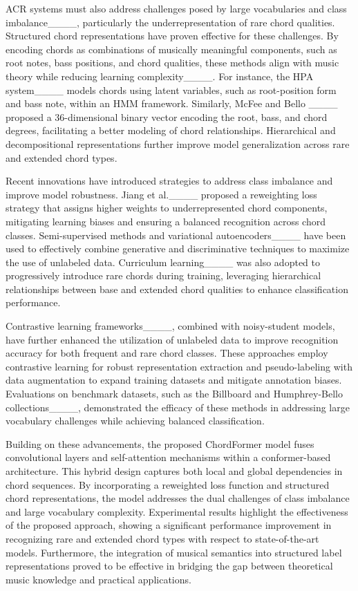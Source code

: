 ACR systems must also address challenges posed by large vocabularies and class imbalance____, particularly the underrepresentation of rare chord qualities. Structured chord representations have proven effective for these challenges. By encoding chords as combinations of musically meaningful components, such as root notes, bass positions, and chord qualities, these methods align with music theory while reducing learning complexity____. For instance, the HPA system____ models chords using latent variables, such as root-position form and bass note, within an HMM framework. Similarly, McFee and Bello ____ proposed a 36-dimensional binary vector encoding the root, bass, and chord degrees, facilitating a better modeling of chord relationships. Hierarchical and decompositional representations further improve model generalization across rare and extended chord types.

Recent innovations have introduced strategies to address class imbalance and improve model robustness. Jiang et al.____ proposed a reweighting loss strategy that assigns higher weights to underrepresented chord components, mitigating learning biases and ensuring a balanced recognition across chord classes. Semi-supervised methods and variational autoencoders____ have been used to effectively combine generative and discriminative techniques to maximize the use of unlabeled data. Curriculum learning____ was also adopted to progressively introduce rare chords during training, leveraging hierarchical relationships between base and extended chord qualities to enhance classification performance.

Contrastive learning frameworks____, combined with noisy-student models, have further enhanced the utilization of unlabeled data to improve recognition accuracy for both frequent and rare chord classes. These approaches employ contrastive learning for robust representation extraction and pseudo-labeling with data augmentation to expand training datasets and mitigate annotation biases. Evaluations on benchmark datasets, such as the Billboard and Humphrey-Bello collections____, demonstrated the efficacy of these methods in addressing large vocabulary challenges while achieving balanced classification.

Building on these advancements, the proposed ChordFormer model fuses convolutional layers and self-attention mechanisms within a conformer-based architecture. This hybrid design captures both local and global dependencies in chord sequences. By incorporating a reweighted loss function and structured chord representations, the model addresses the dual challenges of class imbalance and large vocabulary complexity. Experimental results highlight the effectiveness of the proposed approach, showing a significant performance improvement in recognizing rare and extended chord types  with respect to state-of-the-art models. Furthermore, the integration of musical semantics into structured label representations proved to be effective in bridging the gap between theoretical music knowledge and practical applications.


